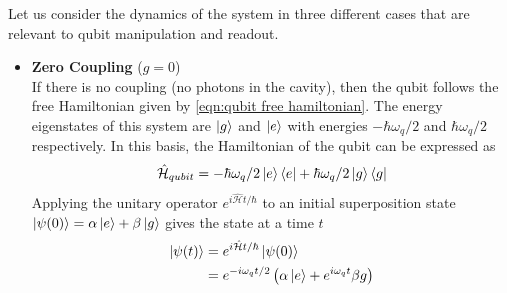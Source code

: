 Let us consider the dynamics of the system in three different cases that are relevant to qubit manipulation and readout.
\begin{itemize}
\item \textbf{Zero Coupling} ($g=0$)\\
If there is no coupling (no photons in the cavity), then the qubit follows the free Hamiltonian given by \ref{eqn:qubit free hamiltonian}. The energy eigenstates of this system are $\ket{g}$ and $\ket{e}$ with energies $-\hbar\omega_q/2$ and $\hbar\omega_q/2$ respectively. In this basis, the Hamiltonian of the qubit can be expressed as
\begin{equation}
\hat{\mathcal{H}}_{qubit} = -\hbar\omega_q/2\ket{e}\bra{e} + \hbar\omega_q/2\ket{g}\bra{g}
\end{equation}
Applying the unitary operator $e^{i\hat{\mathcal{H}}t/\hbar}$ to an initial superposition state $\ket{\psi(0)}=\alpha\ket{e}+\beta\ket{g}$ gives the state at a time $t$
\begin{align}
\begin{split}
\ket{\psi(t)} &= e^{i\hat{\mathcal{H}}t/\hbar}\ket{\psi(0)}\\
&=e^{-i\omega_qt/2}\left(\alpha\ket{e}+e^{i\omega_q t}\beta{g}\right)
\end{split}
\end{align}


\end{itemize}
